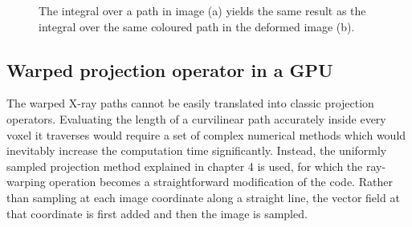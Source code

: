 \begin{figure}
\begin{center} 
\caption[Basic block diagram of the motion modelling approach]{\label{fig:motion} The integral over a path in image (a) yields the same result as the integral over the same coloured path in the deformed image (b).} 
\end{center} 
\end{figure}



\subsection{Warped projection operator in a GPU}

The warped X-ray paths cannot be easily translated into classic projection operators.  Evaluating the length of a curvilinear path accurately inside every voxel it traverses would require a set of complex numerical methods which would inevitably increase the computation time significantly.  Instead, the uniformly sampled projection method explained in chapter 4 is used, for which the ray-warping operation becomes a straightforward modification of the code.  Rather than sampling at each image coordinate along a straight line, the vector field at that coordinate is first added and then the image is sampled.
 
